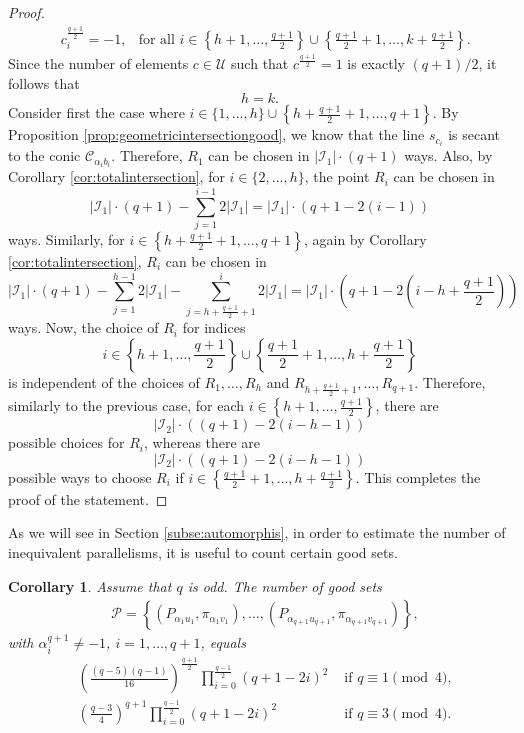 \documentclass[11pt]{article}
\newtheorem{cor}[theorem]{Corollary}
\theoremstyle{definition}
\numberwithin{equation}{section}
\def\cI{\mathcal I}
\def\cP{\mathcal P}
\def\cU{\mathcal U}
\begin{document}
\begin{proof}
\begin{align*}
& c_i^{\frac{q+1}{2}} = -1, & \text{for all } i \in \left\{h+1, \ldots, \frac{q+1}{2} \right\} \cup \left\{ \frac{q+1}{2} + 1, \ldots, k + \frac{q+1}{2} \right\}.
\end{align*}
Since the number of elements $c \in \cU$ such that $c^{\frac{q+1}{2}} = 1$ is exactly $(q+1)/2$, it follows that
\[
h = k.
\]
Consider first the case where $i \in \{1, \ldots, h\} \cup \left\{h + \frac{q+1}{2} + 1, \ldots, q+1\right\}$. By Proposition \ref{prop:geometricintersectiongood}, we know that the line $s_{c_i}$ is secant to the conic $\mathcal{C}_{\alpha_i b_i}$. Therefore, $R_1$ can be chosen in $|\mathcal{I}_1| \cdot (q+1)$ ways. Also, by Corollary \ref{cor:totalintersection}, for $i \in \{2, \ldots, h\}$, the point $R_i$ can be chosen in
\[
|\mathcal{I}_1| \cdot (q+1) - \sum_{j=1}^{i-1} 2|\mathcal{I}_1| = |\mathcal{I}_1| \cdot (q+1 - 2(i - 1))
\]
ways. Similarly, for $i \in \left\{h + \frac{q+1}{2} + 1, \ldots, q+1\right\}$, again by Corollary \ref{cor:totalintersection}, $R_i$ can be chosen in
\[
|\mathcal{I}_1| \cdot (q+1) - \sum_{j=1}^{h - 1} 2|\mathcal{I}_1| - \sum_{j=h + \frac{q+1}{2} + 1}^{i} 2|\mathcal{I}_1| = |\cI_1| \cdot \left(q+1 - 2 \left(i - h + \frac{q+1}{2}\right)\right)
\]
ways. Now, the choice of $R_i$ for indices 
\[
i \in \left\{h+1, \ldots, \frac{q+1}{2} \right\} \cup \left\{ \frac{q+1}{2} + 1, \ldots, h + \frac{q+1}{2} \right\}
\]
is independent of the choices of $R_1, \ldots, R_h$ and $R_{h + \frac{q+1}{2} + 1}, \ldots, R_{q+1}$. Therefore, similarly to the previous case, for each $i \in \left\{h+1,\ldots,\frac{q+1}{2}\right\}$, there are
\[
|\mathcal{I}_2| \cdot \left( (q+1) - 2(i-h-1) \right)
\]
possible choices for $R_i$, whereas there are
\[
|\mathcal{I}_2| \cdot \left( (q+1) - 2(i-h-1) \right)
\]
possible ways to choose $R_i$ if $i \in \left\{\frac{q+1}{2}+1,\ldots,h+\frac{q+1}{2}\right\}$. This completes the proof of the statement.
     \end{proof} 

As we will see in Section \ref{subse:automorphis}, in order to estimate the number of inequivalent parallelisms, it is useful to count certain good sets.%

\begin{cor}\label{cor:allgoodsetsodd}
Assume that $q$ is odd. The number of good sets 
\begin{align*}
& \cP = \left\{\left(P_{\alpha_{1} u_1}, \pi_{\alpha_{1} v_1}\right), \dots, \left(P_{\alpha_{{q+1}} u_{q+1}}, \pi_{\alpha_{{q+1}} v_{q+1}}\right)\right\},  
\end{align*}
with $\alpha_i^{q+1} \neq -1$, $i = 1, \dots, q+1$, equals  
    \begin{align*}
    & \left(\frac{(q-5)(q-1)}{16}\right)^{\frac{q+1}{2}} \prod_{i=0}^{\frac{q-1}{2}} \left(q+1-2i \right)^2 & \mbox{ if }q \equiv 1 \pmod{4}, \\ 
    & \left(\frac{q-3}{4}\right)^{q+1} \prod_{i=0}^{\frac{q-1}{2}} \left(q+1-2i \right)^2 & \mbox{ if } q \equiv 3 \pmod{4}. 
    \end{align*}
\end{cor}
\end{document}
